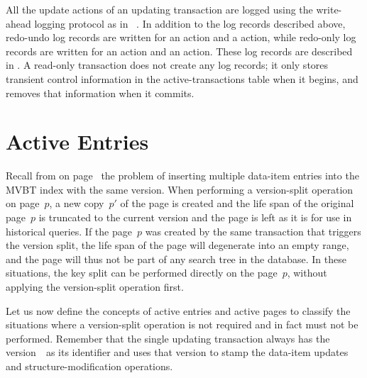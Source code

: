 
All the update actions of an updating transaction are logged using
the write-ahead logging protocol as in
~\cite{mohan:1992:aries}\@.
In addition to the log records described above, redo-undo log records are
written for an  action and a  action, 
while redo-only log records are written for an  action
and an  action.
These log records are described in . 
A read-only transaction does not create any log records; it only stores
transient control information in the active-transactions table when it
begins, and removes that information when it commits.


\section{Active Entries}
\label{sec:tmvbt:active-entries}

Recall from  on
page~\pageref{fig:mvbt-invalid-split} the problem of inserting multiple
data-item entries into the MVBT index with the same version.
When performing a version-split operation on page~$p$, a new copy~$p'$ of the
page is created and the life span of the original page~$p$ is truncated to
the current version and the page is left as it is for use in historical
queries. 
If the page~$p$ was created by the same transaction that triggers the
version split, the life span of the page will degenerate into an empty range,
and the page will thus not be part of any search tree in the database.
In these situations, the key split can be performed directly on the
page~$p$, without applying the version-split operation first.

Let us now define the concepts of active entries and active pages to
classify the situations where a version-split operation is not required and
in fact must not be performed. 
Remember that the single updating transaction always has the version~\actver\
as its identifier and uses that version to stamp the data-item updates
and structure-modification operations.

